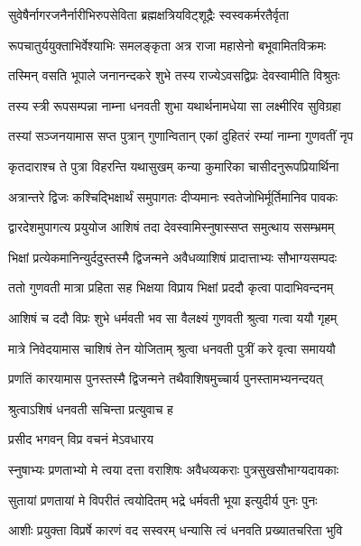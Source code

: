 \twolineshloka
{सुवेषैर्नागरजनैर्नारीभिरुपसेविता}
{ब्रह्मक्षत्रियविट्शूद्रैः स्वस्वकर्मरतैर्वृता} %

\twolineshloka
{रूपचातुर्ययुक्ताभिर्वेश्याभिः समलङ्कृता}
{अत्र राजा महासेनो बभूवामितविक्रमः} %

\twolineshloka
{तस्मिन् वसति भूपाले जनानन्दकरे शुभे}
{तस्य राज्येऽवसद्विप्रः देवस्वामीति विश्रुतः} %

\twolineshloka
{तस्य स्त्री रूपसम्पन्ना नाम्ना धनवती शुभा}
{यथार्थनामधेया सा लक्ष्मीरिव सुविग्रहा} %

\twolineshloka
{तस्यां सञ्जनयामास सप्त पुत्रान् गुणान्वितान्}
{एकां दुहितरं रम्यां नाम्ना गुणवतीं नृप} %

\twolineshloka
{कृतदाराश्च ते पुत्रा विहरन्ति यथासुखम्}
{कन्या कुमारिका चासीदनुरूपप्रियार्थिना} %

\twolineshloka
{अत्रान्तरे द्विजः कश्चिद्भिक्षार्थं समुपागतः}
{दीप्यमानः स्वतेजोभिर्मूर्तिमानिव पावकः} %

\twolineshloka
{द्वारदेशमुपागत्य प्रयुयोज आशिषं तदा}
{देवस्वामिस्नुषास्सप्त समुत्थाय ससम्भ्रमम्} %

\twolineshloka
{भिक्षां प्रत्येकमानिन्युर्ददुस्तस्मै द्विजन्मने}
{अवैधव्याशिषं प्रादात्ताभ्यः सौभाग्यसम्पदः} %

\twolineshloka
{ततो गुणवती मात्रा प्रहिता सह भिक्षया}
{विप्राय भिक्षां प्रददौ कृत्वा पादाभिवन्दनम्} %

\twolineshloka
{आशिषं च ददौ विप्रः शुभे धर्मवती भव}
{सा वैलक्ष्यं गुणवती श्रुत्वा गत्वा ययौ गृहम्} %

\twolineshloka
{मात्रे निवेदयामास चाशिषं तेन योजिताम्}
{श्रुत्वा धनवती पुत्रीं करे वृत्वा समाययौ} %

\twolineshloka
{प्रणतिं कारयामास पुनस्तस्मै द्विजन्मने}
{तथैवाशिषमुच्चार्य पुनस्तामभ्यनन्दयत्} %

\onelineshloka
{श्रुत्वाऽशिषं धनवती सचिन्ता प्रत्युवाच ह} %


\onelineshloka
{प्रसीद भगवन् विप्र वचनं मेऽवधारय} %

\twolineshloka
{स्नुषाभ्यः प्रणताभ्यो मे त्वया दत्ता वराशिषः}
{अवैधव्यकराः पुत्रसुखसौभाग्यदायकाः} %

\twolineshloka
{सुतायां प्रणतायां मे विपरीतं त्वयोदितम्}
{भद्रे धर्मवती भूया इत्युदीर्य पुनः पुनः} %

\twolineshloka
{आशीः प्रयुक्ता विप्रर्षे कारणं वद सस्वरम्}
{धन्यासि त्वं धनवति प्रख्यातचरिता भुवि} %

